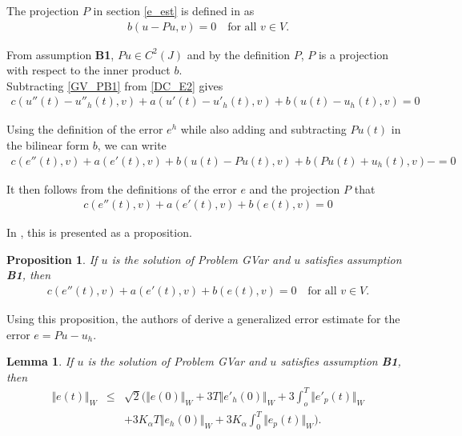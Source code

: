 \documentclass[../../main.tex]{subfiles}
\begin{document}
The projection $P$ in section \eqref{e_est} is defined in \cite{BV13} as
\begin{eqnarray*}
	b(u-Pu,v) = 0 \ \ \ \textrm{ for all } v \in V.
\end{eqnarray*}

From assumption \textbf{B1}, $Pu \in C^2(J)$ and by the definition $P$, $P$ is a projection with respect to the inner product $b$.\\

Subtracting \eqref{GV_PB1} from \eqref{DC_E2} gives
\begin{eqnarray*}
	c(u''(t)-u''_h(t),v) + a(u'(t)-u'_h(t),v) + b(u(t)-u_h(t),v) = 0
\end{eqnarray*}

Using the definition of the error $e^h$ while also adding and subtracting $Pu(t)$ in the bilinear form $b$, we can write
\begin{eqnarray*}
	c(e''(t),v) + a(e'(t),v) + b(u(t) - Pu(t),v) + b(Pu(t) +u_h(t),v)- = 0
\end{eqnarray*}

It then follows from the definitions of the error $e$ and the projection $P$ that
\begin{eqnarray*}
	c(e''(t),v) + a(e'(t),v) + b(e(t),v) = 0
\end{eqnarray*}

In \cite{BV13}, this is presented as a proposition.
\newtheorem{DC_Prop1}{Proposition}
\begin{DC_Prop1}
	If $u$ is the solution of Problem GVar and $u$ satisfies assumption \textbf{B1}, then
	\begin{eqnarray}
		c(e''(t),v) + a(e'(t),v) + b(e(t),v) = 0 \ \ \ \textrm{ for all } v \in V.
	\end{eqnarray}
\end{DC_Prop1}

Using this proposition, the authors of \cite{BV13} derive a generalized error estimate for the error $e = Pu - u_h$.

\newtheorem{lem_1}{Lemma}
\begin{lem_1}
	If $u$ is the solution of Problem GVar and $u$ satisfies assumption \textbf{B1}, then
	\begin{eqnarray}
		\Vert e(t)\Vert_{W} &\leq& \sqrt{2} \biggl( \Vert e(0) \Vert_W + 3T\Vert e'_h(0) \Vert_W + 3 \int_o^T \Vert e'_p(t)\Vert_W\nonumber \\
		&& + 3K_\alpha T \Vert e_h(0) \Vert_W + 3K_\alpha \int_0^T \Vert e_p(t) \Vert_W \biggr). \label{fundamental_estimate}
	\end{eqnarray}
\end{lem_1}
\end{document}
